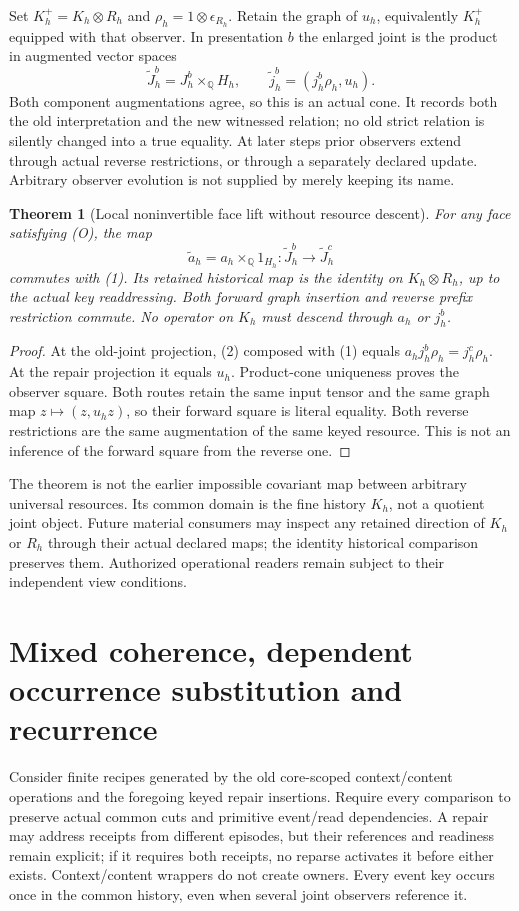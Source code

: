 \documentclass{article}
\newtheorem{theorem}{Theorem}\newtheorem{proposition}{Proposition}
\begin{document}
Set $K^+_h=K_h\otimes R_h$ and $\rho_h=1\otimes\epsilon_{R_h}$. Retain the graph of $u_h$, equivalently $K^+_h$ equipped with that observer. In presentation $b$ the enlarged joint is the product in augmented vector spaces
\[
       \widetilde J^b_h=J^b_h\times_{\mathbb Q}H_h,
       \qquad \widetilde j^b_h=(j^b_h\rho_h,u_h).             \tag{1}
\]
Both component augmentations agree, so this is an actual cone. It records both the old interpretation and the new witnessed relation; no old strict relation is silently changed into a true equality. At later steps prior observers extend through actual reverse restrictions, or through a separately declared update. Arbitrary observer evolution is not supplied by merely keeping its name.

\begin{theorem}[Local noninvertible face lift without resource descent]
For any face satisfying (O), the map
\[
 \widetilde a_h=a_h\times_{\mathbb Q}1_{H_h}:
 \widetilde J^b_h\to\widetilde J^c_h                         \tag{2}
\]
commutes with (1). Its retained historical map is the identity on $K_h\otimes R_h$, up to the actual key readdressing. Both forward graph insertion and reverse prefix restriction commute. No operator on $K_h$ must descend through $a_h$ or $j^b_h$.
\end{theorem}
\begin{proof}
At the old-joint projection, (2) composed with (1) equals $a_hj^b_h\rho_h=j^c_h\rho_h$. At the repair projection it equals $u_h$. Product-cone uniqueness proves the observer square. Both routes retain the same input tensor and the same graph map $z\mapsto(z,u_hz)$, so their forward square is literal equality. Both reverse restrictions are the same augmentation of the same keyed resource. This is not an inference of the forward square from the reverse one.\end{proof}

The theorem is not the earlier impossible covariant map between arbitrary universal resources. Its common domain is the fine history $K_h$, not a quotient joint object. Future material consumers may inspect any retained direction of $K_h$ or $R_h$ through their actual declared maps; the identity historical comparison preserves them. Authorized operational readers remain subject to their independent view conditions.

\section{Mixed coherence, dependent occurrence substitution and recurrence}
Consider finite recipes generated by the old core-scoped context/content operations and the foregoing keyed repair insertions. Require every comparison to preserve actual common cuts and primitive event/read dependencies. A repair may address receipts from different episodes, but their references and readiness remain explicit; if it requires both receipts, no reparse activates it before either exists. Context/content wrappers do not create owners. Every event key occurs once in the common history, even when several joint observers reference it.
\end{document}
